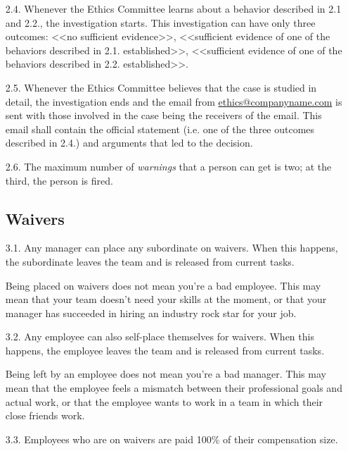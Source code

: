 \documentclass[11pt]{article}
\theoremstyle{remark}
\theoremstyle{definition}
\begin{document}
\begin{enumerate}
\item[2.4.] Whenever the Ethics Committee learns about a behavior described in 2.1 and 2.2., the investigation starts. This investigation can have only three outcomes: <<no sufficient evidence>>, <<sufficient evidence of one of the behaviors described in 2.1. established>>, <<sufficient evidence of one of the behaviors described in 2.2. established>>. 




\item[2.5.] Whenever the Ethics Committee believes that the case is studied in detail, the investigation ends and the email from \href{mailto:ethics@companyname.com}{ethics@companyname.com} is sent with those involved in the case being the receivers of the email. This email shall contain the official statement (i.e. one of the three outcomes described in 2.4.) and arguments that led to the decision.



\item[2.6.] The maximum number of \textit{warnings} that a person can get is two; at the third, the person is fired. 




 



\subsection{Waivers}

\item[3.1.] Any manager can place any subordinate on waivers. When this happens, the subordinate leaves the team and is released from current tasks.

Being placed on waivers does not mean you're a bad employee. This may mean that your team doesn't need your skills at the moment, or that your manager has succeeded in hiring an industry rock star for your job.


\item[3.2.] Any employee can also self-place themselves for waivers. When this happens, the employee leaves the team and is released from current tasks.

Being left by an employee does not mean you're a bad manager. This may mean that the employee feels a mismatch between their professional goals and actual work, or that the employee wants to work in a team in which their close friends work.


\item[3.3.] Employees who are on waivers are paid 100\% of their compensation size. 


\end{enumerate}
\end{document}
